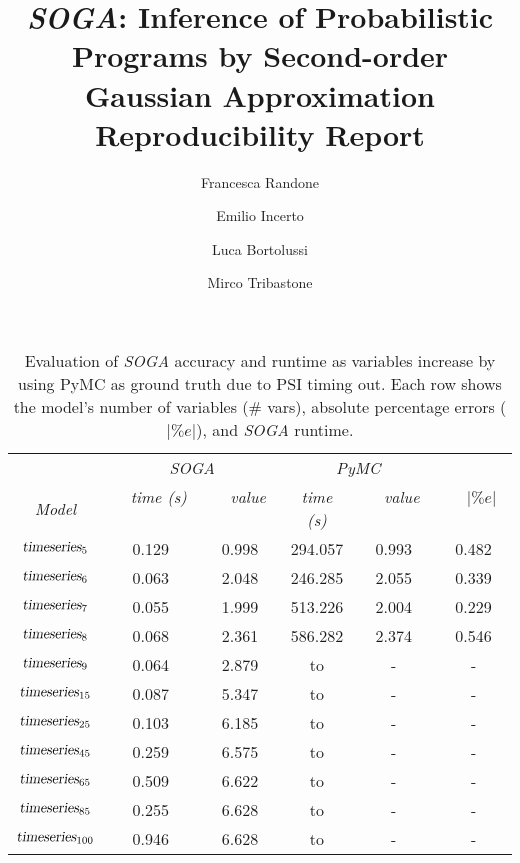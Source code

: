 \documentclass[a4paper]{llncs}
\newcommand{\soga}{\textsl{SOGA}}
\begin{document}
\mainmatter

\title{\soga: Inference of Probabilistic Programs by Second-order Gaussian Approximation Reproducibility Report}


\author{Francesca Randone  \and Emilio Incerto  \and Luca Bortolussi  \and Mirco Tribastone}

\allowdisplaybreaks[0]

\maketitle
\setcounter{table}{1}
\begin{table}[t]
    \centering
    \caption{Evaluation of \soga{} accuracy and runtime as variables increase by using PyMC as ground truth due to PSI timing out. Each row shows the model's number of variables (\# vars), absolute percentage errors ($|\%e|$), and \soga{} runtime.} 
     \begin{tabular}{cccccc}
     \toprule 
        &\multicolumn{2}{c}{\emph{SOGA}}&\multicolumn{2}{c}{\emph{PyMC}}\\
        \cmidrule(l){2-3}  \cmidrule(l){4-5}
        \emph{Model}&
    \ \ \emph{time (s)}  \ \ &  \ \  \emph{value} \ \ & \emph{time (s)} 
    & \ \  \emph{value} \ \  &\ \  $|\%e|$ \ \  \\
    \midrule
        $\textsl{timeseries}_{5}$ & 0.129 & 0.998 & 294.057 & 0.993 &0.482 \\
        $\textsl{timeseries}_{6}$ & 0.063 & 2.048 & 246.285 & 2.055 &0.339 \\
        $\textsl{timeseries}_{7}$ & 0.055 & 1.999 & 513.226 & 2.004 &0.229 \\
        $\textsl{timeseries}_{8}$ & 0.068 & 2.361 & 586.282 & 2.374 &0.546 \\
        $\textsl{timeseries}_{9}$ & 0.064 & 2.879 & to & - &- \\
        $\textsl{timeseries}_{15}$ & 0.087 & 5.347 & to & - &- \\
        $\textsl{timeseries}_{25}$ & 0.103 & 6.185 & to & - &- \\
        $\textsl{timeseries}_{45}$ & 0.259 & 6.575 & to & - &- \\
        $\textsl{timeseries}_{65}$ & 0.509 & 6.622 & to & - &- \\
        $\textsl{timeseries}_{85}$ & 0.255 & 6.628 & to & - &- \\
        $\textsl{timeseries}_{100}$ & 0.946 & 6.628 & to & - &- \\
    \bottomrule
    \end{tabular}
    \label{tab:sensVar}
\end{table}
\end{document}
